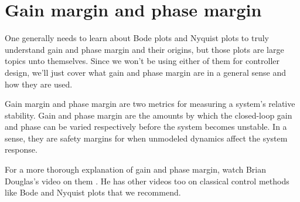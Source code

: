 \section{Gain margin and phase margin}
\label{sec:gain_phase_margin}

One generally needs to learn about Bode plots and Nyquist plots to truly
understand gain and phase margin and their origins, but those plots are large
topics unto themselves. Since we won't be using either of them for controller
design, we'll just cover what gain and phase margin are in a general sense and
how they are used.

Gain margin and phase margin are two metrics for measuring a \gls{system}'s
relative stability. Gain and phase margin are the amounts by which the
closed-loop gain and phase can be varied respectively before the \gls{system}
becomes unstable. In a sense, they are safety margins for when unmodeled
dynamics affect the \gls{system response}.

For a more thorough explanation of gain and phase margin, watch Brian Douglas's
video on them \cite{bib:gain_phase_margin}. He has other videos too on classical
control methods like Bode and Nyquist plots that we recommend.
